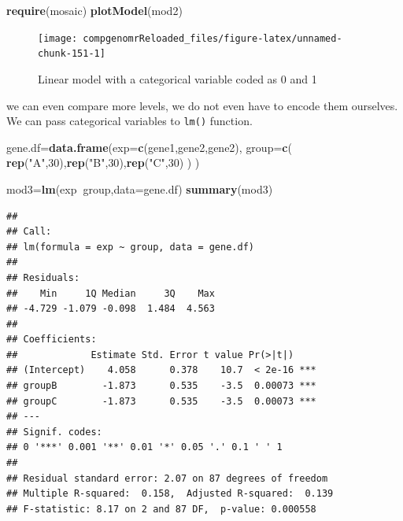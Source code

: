 \documentclass[12pt,]{krantz}
\newenvironment{Shaded}{\begin{snugshade}}{\end{snugshade}}
\newcommand{\DataTypeTok}[1]{\textcolor[rgb]{0.13,0.29,0.53}{#1}}
\newcommand{\DecValTok}[1]{\textcolor[rgb]{0.00,0.00,0.81}{#1}}
\newcommand{\KeywordTok}[1]{\textcolor[rgb]{0.13,0.29,0.53}{\textbf{#1}}}
\newcommand{\NormalTok}[1]{#1}
\newcommand{\OperatorTok}[1]{\textcolor[rgb]{0.81,0.36,0.00}{\textbf{#1}}}
\newcommand{\StringTok}[1]{\textcolor[rgb]{0.31,0.60,0.02}{#1}}
\begin{document}
\begin{Shaded}
\begin{Highlighting}[]
\KeywordTok{require}\NormalTok{(mosaic)}
\KeywordTok{plotModel}\NormalTok{(mod2)}
\end{Highlighting}
\end{Shaded}

\begin{figure}

{\centering \texttt{[image: compgenomrReloaded\_files/figure-latex/unnamed-chunk-151-1]} 

}

\caption{Linear model with a categorical variable coded as 0 and 1}\label{fig:unnamed-chunk-151}
\end{figure}

we can even compare more levels, we do not even have to encode them
ourselves. We can pass categorical variables to \texttt{lm()} function.

\begin{Shaded}
\begin{Highlighting}[]
\NormalTok{gene.df=}\KeywordTok{data.frame}\NormalTok{(}\DataTypeTok{exp=}\KeywordTok{c}\NormalTok{(gene1,gene2,gene2),}
                  \DataTypeTok{group=}\KeywordTok{c}\NormalTok{( }\KeywordTok{rep}\NormalTok{(}\StringTok{"A"}\NormalTok{,}\DecValTok{30}\NormalTok{),}\KeywordTok{rep}\NormalTok{(}\StringTok{"B"}\NormalTok{,}\DecValTok{30}\NormalTok{),}\KeywordTok{rep}\NormalTok{(}\StringTok{"C"}\NormalTok{,}\DecValTok{30}\NormalTok{) ) }
\NormalTok{                  )}

\NormalTok{mod3=}\KeywordTok{lm}\NormalTok{(exp}\OperatorTok{~}\NormalTok{group,}\DataTypeTok{data=}\NormalTok{gene.df)}
\KeywordTok{summary}\NormalTok{(mod3)}
\end{Highlighting}
\end{Shaded}

\begin{verbatim}
## 
## Call:
## lm(formula = exp ~ group, data = gene.df)
## 
## Residuals:
##    Min     1Q Median     3Q    Max 
## -4.729 -1.079 -0.098  1.484  4.563 
## 
## Coefficients:
##             Estimate Std. Error t value Pr(>|t|)    
## (Intercept)    4.058      0.378    10.7  < 2e-16 ***
## groupB        -1.873      0.535    -3.5  0.00073 ***
## groupC        -1.873      0.535    -3.5  0.00073 ***
## ---
## Signif. codes:  
## 0 '***' 0.001 '**' 0.01 '*' 0.05 '.' 0.1 ' ' 1
## 
## Residual standard error: 2.07 on 87 degrees of freedom
## Multiple R-squared:  0.158,  Adjusted R-squared:  0.139 
## F-statistic: 8.17 on 2 and 87 DF,  p-value: 0.000558
\end{verbatim}
\end{document}
